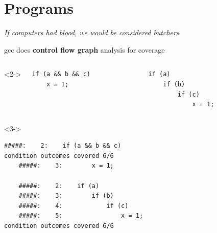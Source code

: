 \documentclass[xcolor = {dvipsnames, table}, aspectratio=169]{beamer}
\begin{document}
\section{Programs}

\begin{frame}
    \begin{block}{}
        \emph{If computers had blood, we would be considered butchers}
    \end{block}
\end{frame}

\begin{frame}[fragile]
    \begin{block}{}
        gcc does \textbf{control flow graph} analysis for coverage
    \end{block}

    \begin{columns}<2->
        \begin{column}{0.5\textwidth}
            \centering
            \begin{lstlisting}[basicstyle = \scriptsize\ttfamily]
if (a && b && c)
    x = 1;
            \end{lstlisting}
        \end{column}

        \begin{column}{0.5\textwidth}
            \centering
            \begin{lstlisting}[basicstyle = \scriptsize\ttfamily]
if (a)
    if (b)
        if (c)
            x = 1;
            \end{lstlisting}
        \end{column}
    \end{columns}

    \begin{block}<3->
        \centering
        \begin{lstlisting}[basicstyle = \scriptsize\ttfamily]
    #####:    2:    if (a && b && c)
condition outcomes covered 6/6
    #####:    3:        x = 1;

    #####:    2:    if (a)
    #####:    3:        if (b)
    #####:    4:            if (c)
    #####:    5:                x = 1;
condition outcomes covered 6/6
        \end{lstlisting}
    \end{block}
\end{frame}
\end{document}
